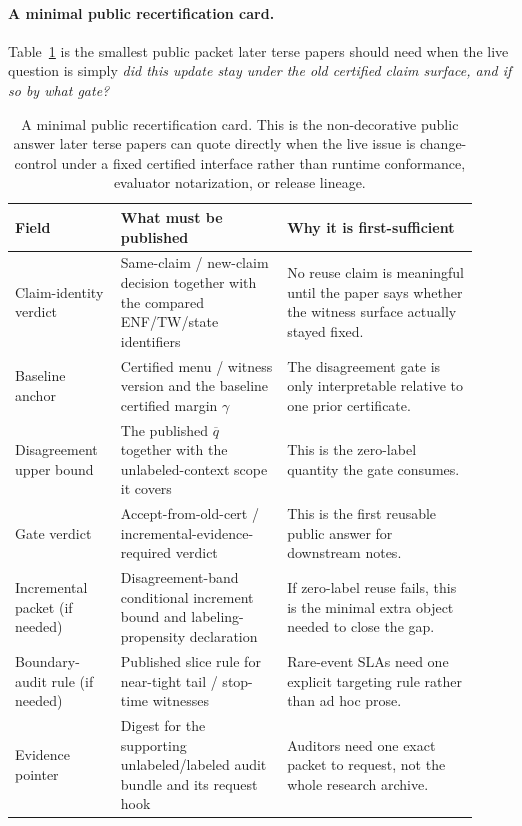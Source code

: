 \documentclass[11pt]{article}
\begin{document}
\paragraph{A minimal public recertification card.}
Table~\ref{tab:minimal-recert-card} is the smallest public packet later terse papers should need when the live question is simply \emph{did this update stay under the old certified claim surface, and if so by what gate?}

\begin{table}[t]
\centering
\small
\begin{tabular}{@{}p{0.21\linewidth}p{0.33\linewidth}p{0.38\linewidth}@{}}
\toprule
Field & What must be published & Why it is first-sufficient \\
\midrule
Claim-identity verdict & Same-claim / new-claim decision together with the compared ENF/TW/state identifiers & No reuse claim is meaningful until the paper says whether the witness surface actually stayed fixed. \\
Baseline anchor & Certified menu / witness version and the baseline certified margin $\gamma$ & The disagreement gate is only interpretable relative to one prior certificate. \\
Disagreement upper bound & The published $\overline q$ together with the unlabeled-context scope it covers & This is the zero-label quantity the gate consumes. \\
Gate verdict & Accept-from-old-cert / incremental-evidence-required verdict & This is the first reusable public answer for downstream notes. \\
Incremental packet (if needed) & Disagreement-band conditional increment bound and labeling-propensity declaration & If zero-label reuse fails, this is the minimal extra object needed to close the gap. \\
Boundary-audit rule (if needed) & Published slice rule for near-tight tail / stop-time witnesses & Rare-event SLAs need one explicit targeting rule rather than ad hoc prose. \\
Evidence pointer & Digest for the supporting unlabeled/labeled audit bundle and its request hook & Auditors need one exact packet to request, not the whole research archive. \\
\bottomrule
\end{tabular}
\caption{A minimal public recertification card. This is the non-decorative public answer later terse papers can quote directly when the live issue is change-control under a fixed certified interface rather than runtime conformance, evaluator notarization, or release lineage.}
\label{tab:minimal-recert-card}
\end{table}
\end{document}
